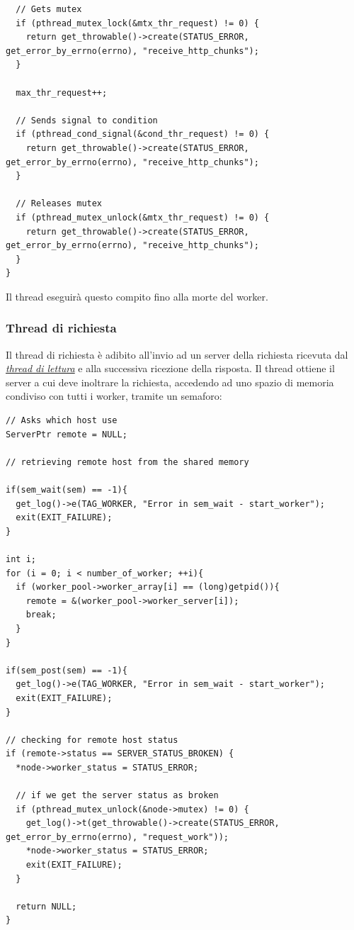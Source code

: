 \documentclass[italian]{tktltiki2}
\begin{document}
\begin{lstlisting}
  // Gets mutex
  if (pthread_mutex_lock(&mtx_thr_request) != 0) {
    return get_throwable()->create(STATUS_ERROR, get_error_by_errno(errno), "receive_http_chunks");
  }

  max_thr_request++;

  // Sends signal to condition
  if (pthread_cond_signal(&cond_thr_request) != 0) {
    return get_throwable()->create(STATUS_ERROR, get_error_by_errno(errno), "receive_http_chunks");
  }

  // Releases mutex
  if (pthread_mutex_unlock(&mtx_thr_request) != 0) {
    return get_throwable()->create(STATUS_ERROR, get_error_by_errno(errno), "receive_http_chunks");
  }
}
\end{lstlisting}
Il thread eseguirà questo compito fino alla morte del worker.
\subsubsection{Thread di richiesta}
\label{sec:request}
Il thread di richiesta è adibito all'invio ad un server della richiesta ricevuta dal \hyperref[sec:request]{\emph{thread di lettura}} e alla successiva ricezione della risposta. Il thread ottiene il server a cui deve inoltrare la richiesta, accedendo ad uno spazio di memoria condiviso con tutti i worker, tramite un semaforo:
\begin{lstlisting}
// Asks which host use
ServerPtr remote = NULL;

// retrieving remote host from the shared memory

if(sem_wait(sem) == -1){
  get_log()->e(TAG_WORKER, "Error in sem_wait - start_worker");
  exit(EXIT_FAILURE);
}

int i;
for (i = 0; i < number_of_worker; ++i){
  if (worker_pool->worker_array[i] == (long)getpid()){
    remote = &(worker_pool->worker_server[i]);
    break;
  }
}

if(sem_post(sem) == -1){
  get_log()->e(TAG_WORKER, "Error in sem_wait - start_worker");
  exit(EXIT_FAILURE);
}

// checking for remote host status
if (remote->status == SERVER_STATUS_BROKEN) {
  *node->worker_status = STATUS_ERROR;

  // if we get the server status as broken
  if (pthread_mutex_unlock(&node->mutex) != 0) {
    get_log()->t(get_throwable()->create(STATUS_ERROR, get_error_by_errno(errno), "request_work"));
    *node->worker_status = STATUS_ERROR;
    exit(EXIT_FAILURE);
  }

  return NULL;
}
\end{lstlisting}
\end{document}
